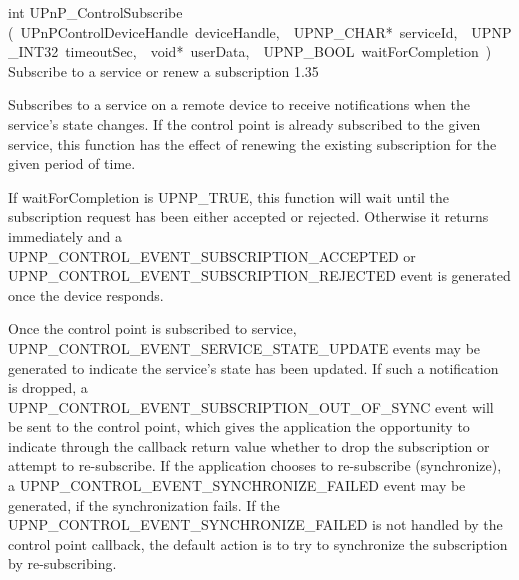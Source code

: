 \documentclass{article}
\begin{document}
\begin{cxxentry}
\begin{cxxfunction}
\begin{cxxdoc}
\end{cxxdoc}
\end{cxxfunction}
\begin{cxxfunction}
{int}
        {UPnP\_ControlSubscribe}
        {(\ UPnPControlDeviceHandle\ deviceHandle,\ \ UPNP\_CHAR*\ serviceId,\ \ UPNP\_INT32\ timeoutSec,\ \ void*\ userData,\ \ UPNP\_BOOL\ waitForCompletion\ )}
        {Subscribe to a service or renew a subscription }
        {1.35}
\begin{cxxdoc}

Subscribes to a service on a remote device to receive notifications
when the service's state changes.  If the control point is already
subscribed to the given service, this function has the effect of
renewing the existing subscription for the given period of time.

If waitForCompletion is UPNP\_TRUE, this function will wait until the
subscription request has been either accepted or rejected.  Otherwise
it returns immediately and a UPNP\_CONTROL\_EVENT\_SUBSCRIPTION\_ACCEPTED
or UPNP\_CONTROL\_EVENT\_SUBSCRIPTION\_REJECTED event is generated once
the device responds.

Once the control point is subscribed to service,
UPNP\_CONTROL\_EVENT\_SERVICE\_STATE\_UPDATE	events may be generated to
indicate the service's state has been updated. If such a notification
is dropped, a UPNP\_CONTROL\_EVENT\_SUBSCRIPTION\_OUT\_OF\_SYNC event will be
sent to the control point, which gives the application the opportunity
to indicate through the callback return value whether to drop the
subscription or attempt to re-subscribe.  If the application chooses to
re-subscribe (synchronize), a UPNP\_CONTROL\_EVENT\_SYNCHRONIZE\_FAILED
event may be generated, if the synchronization fails.  If the
UPNP\_CONTROL\_EVENT\_SYNCHRONIZE\_FAILED is not handled by the control
point callback, the default action is to try to synchronize the
subscription by re-subscribing.


\end{cxxdoc}
\end{cxxfunction}
\end{cxxentry}
\end{document}
